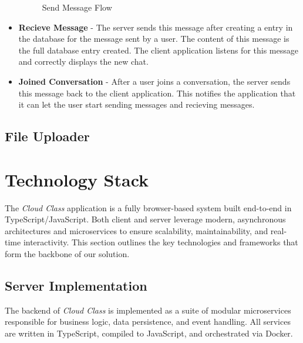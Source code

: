\begin{itemize}
\begin{figure}[H]
        \caption*{Send Message Flow}
        \label{fig:send-message-flow}
    \end{figure}
    \item \textbf{Recieve Message} - The server sends this message after creating a entry in the database for the message sent by a user. The content of this message is the full database entry created. The client application listens for this message and correctly displays the new chat.
    \item \textbf{Joined Conversation} - After a user joins a conversation, the server sends this message back to the client application. This notifies the application that it can let the user start sending messages and recieving messages.
\end{itemize}

\subsection{File Uploader}



\section{Technology Stack}

The \emph{Cloud Class} application is a fully browser-based system built end-to-end in TypeScript/JavaScript.  Both client and server leverage modern, asynchronous architectures and microservices to ensure scalability, maintainability, and real-time interactivity.  This section outlines the key technologies and frameworks that form the backbone of our solution.

\subsection{Server Implementation}

The backend of \emph{Cloud Class} is implemented as a suite of modular microservices responsible for business logic, data persistence, and event handling.  All services are written in \mbox{TypeScript}, compiled to JavaScript, and orchestrated via Docker.

